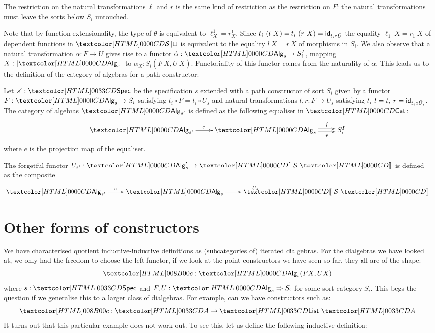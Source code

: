 The restriction on the natural transformations $\ell$ and $r$ is the
same kind of restriction as the restriction on $F$: the natural
transformations must leave the sorts below $S_i$ untouched.

Note that by function extensionality, the type of $\theta$ is
equivalent to $\ell^1_X = r^1_X$. Since
$t_i\ (l\ X) = t_i\ (r\ X) = \id_{t_i \circ \bar{U}}$ the equality
$\ell_1\ X = r_1\ X$ of dependent functions in $\SET$ is equivalent to
the equality $l\ X = r\ X $ of morphisms in $S_i$. We also observe
that a natural transformation $\alpha : F \to \bar{U}$ gives rise to a
functor $\hat{\alpha} : \Alg_s \to S_i^I$, mapping $X : | \Alg_s |$ to
$\alpha_X : S_i(F\ X,\bar{U}\ X)$. Functoriality of this functor comes
from the naturality of $\alpha$. This leads us to the definition of
the category of algebras for a path constructor:

\begin{definition}
  Let $s' : \specty$ be the specification
  $s$ extended with a path constructor of sort
  $S_i$ given by a functor $F : \Alg_s \to S_i$ satisfying $t_i \circ
  F = t_i \circ \bar{U}_s$ and natural transformations $l, r : F \to
  \bar{U}_s$ satisfying $t_i\ l = t_i\ r = \id_{t_i \circ
    \bar{U}_s}$. The category of algebras
  $\Alg_{s'}$ is defined as the following equaliser in $\Cat$:
  \[
  \xymatrix{
    \Alg_{s'} \ar[r]^{e} &\Alg_s \ar@<-.5ex>[r]_-{\hat{r}} \ar@<.5ex>[r]^-{\hat{l}} &S_i^I
  }
  \]
  where $e$ is the projection map of the equaliser.

The forgetful functor $U_{s'} : \Alg_s' \to \SortCat{\Ss}$ is defined as the composite
\[
\xymatrix{
    \Alg_{s'} \ar[r]^{e} &\Alg_s \ar[r]^{U_s} &\SortCat{\Ss}
}
\]
\end{definition}

\section{Other forms of constructors}
\label{other-forms-of-constructors}

We have characterised quotient inductive-inductive definitions as
(subcategories of) iterated dialgebras. For the dialgebras we have
looked at, we only had the freedom to choose the left functor, \ie if
we look at the point constructors we have seen so far, they all are of
the shape:
$$
\Ac : \Alg_s(F X , U X)
$$
where $s : \specty$ and $F, U : \Func{\Alg_s}{S_i}$ for some sort
category $S_i$. This begs the question if we generalise this to a
larger class of dialgebras. For example, can we have constructors such
as:
$$
\Ac : \Aty \to \List\ \Aty
$$
It turns out that this particular example does not work out. To see
this, let us define the following inductive definition:
\begin{datatype}{\Aty}{\Set}
  \constr{\Aco}{\Aty} \\
  \constr{\Aci}{\Aty \to \List\ \Aty}
\end{datatype}

